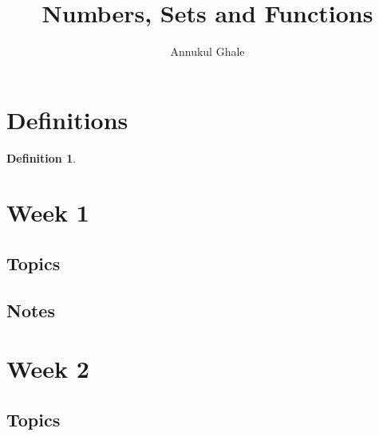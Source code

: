 \documentclass[12pt]{article}
\newtheorem{definition}{Definition}
\begin{document}
\title{\textbf{Numbers, Sets and Functions}}
\author{Annukul Ghale}


\maketitle

\tableofcontents
\newpage



\section{Definitions}


\begin{definition}
\end{definition}



\section{Week 1}

\subsection{Topics}



\subsection{Notes}






\section{Week 2}

\subsection{Topics}
\end{document}
